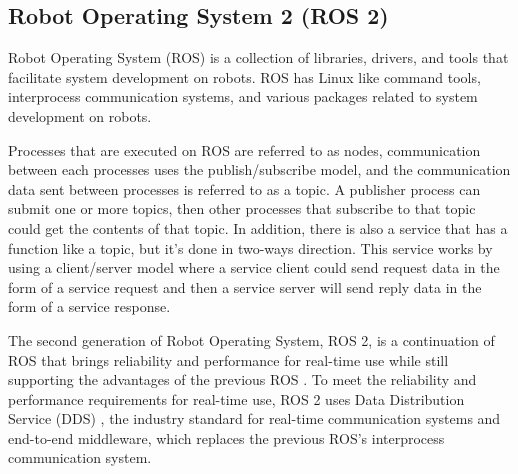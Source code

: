 \subsection{Robot Operating System 2 (ROS 2)}
\label{subsec:ros2}

Robot Operating System (ROS) \citep{quigley2009} is a collection of libraries, drivers,
  and tools that facilitate system development on robots.
ROS has Linux like command tools,
  interprocess communication systems, and various packages related to system development on robots.

Processes that are executed on ROS are referred to as nodes,
  communication between each processes uses the publish/subscribe model,
  and the communication data sent between processes is referred to as a topic.
A publisher process can submit one or more topics,
  then other processes that subscribe to that topic could get the contents of that topic.
In addition, there is also a service that has a function like a topic,
  but it's done in two-ways direction.
This service works by using a client/server model where a service client could send request data in the form of a service request and then a service server will send reply data in the form of a service response.

The second generation of Robot Operating System, ROS 2,
  is a continuation of ROS that brings reliability and performance for real-time use while still supporting the advantages of the previous ROS \citep{maruyama2016}.
To meet the reliability and performance requirements for real-time use,
  ROS 2 uses Data Distribution Service (DDS) \citep{castellote2003}\citep{schlesselman2004},
  the industry standard for real-time communication systems and end-to-end middleware,
  which replaces the previous ROS's interprocess communication system.
